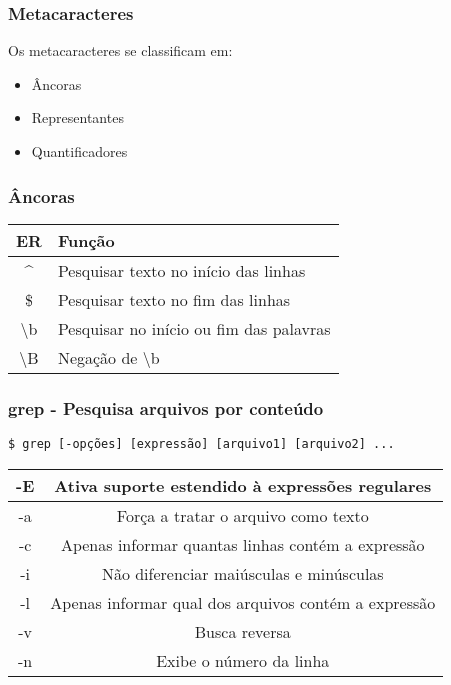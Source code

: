 \documentclass{beamer}
\begin{document}
   \begin{frame}
      \frametitle{Metacaracteres}
      Os metacaracteres se classificam em:
      \begin{itemize}
         \item Âncoras
	      \item Representantes
	      \item Quantificadores
      \end{itemize}
   \end{frame}

   \begin{frame}
      \frametitle{Âncoras}
      \begin{table}
         \begin{tabular}{ c | l }
         \textbf{ER} & \textbf{Função}  \\
         \hline 
         \^{} & Pesquisar texto no início das linhas \\
         \hline
         \$ & Pesquisar texto no fim das linhas  \\
         \hline
         \textbackslash b & Pesquisar no início ou fim das palavras  \\
         \hline
         \textbackslash B & Negação de \textbackslash b  \\
         \hline
         \end{tabular}
      \end{table}
   \end{frame}

\begin{frame}[fragile]
   \frametitle{grep - Pesquisa arquivos por conteúdo}
   \begin{verbatim}
$ grep [-opções] [expressão] [arquivo1] [arquivo2] ...
   \end{verbatim}
   \begin{table}
      \begin{tabular}{ c | c }
         \textbf{-E} & \textbf{Ativa suporte estendido à expressões regulares} \\ 
	 \hline
	 -a & Força a tratar o arquivo como texto \\
	 \hline
         -c & Apenas informar quantas linhas contém a expressão \\
         \hline 
         -i & Não diferenciar maiúsculas e minúsculas \\
         \hline
         -l & Apenas informar qual dos arquivos contém a expressão \\
         \hline
         -v & Busca reversa \\
         \hline
         -n & Exibe o número da linha \\
         \hline
      \end{tabular}
   \end{table}
\end{frame}
\end{document}
